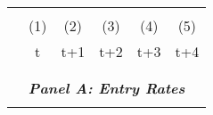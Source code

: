 \begin{tabular}{lccccc} \hline
    \vspace{-2pt} & \vspace{-2pt} & \vspace{-2pt} & \vspace{-2pt} & \vspace{-2pt} \\
     & (1) & (2) & (3) & (4) & (5) \\
     & t & t+1 & t+2 & t+3 & t+4 \\ 
     
    \vspace{-2pt} & \vspace{-2pt} & \vspace{-2pt} & \vspace{-2pt} & \vspace{-2pt} \\
    \cmidrule{1-6}
    \vspace{-1.5pt} & \vspace{-1.5pt} & \vspace{-1.5pt} & \vspace{-1.5pt} & \vspace{-1.5pt} \\
    \multicolumn{6}{c}{\textit{\textbf{Panel A: Entry Rates}}} \\ 
    \vspace{-1.5pt} & \vspace{-1.5pt} & \vspace{-1.5pt} & \vspace{-1.5pt} & \vspace{-1.5pt} \\


\end{tabular}
